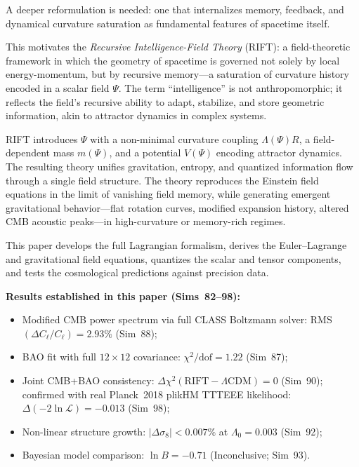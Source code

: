 \documentclass[12pt,a4paper]{article}
\begin{document}
A deeper reformulation is needed: one that internalizes memory, feedback,
and dynamical curvature saturation as fundamental features of spacetime
itself.

This motivates the \emph{Recursive Intelligence-Field Theory} (RIFT):
a field-theoretic framework in which the geometry of spacetime is
governed not solely by local energy-momentum, but by recursive memory---a
saturation of curvature history encoded in a scalar field $\Psi$. The
term ``intelligence'' is not anthropomorphic; it reflects the field's
recursive ability to adapt, stabilize, and store geometric information,
akin to attractor dynamics in complex systems.

RIFT introduces $\Psi$ with a non-minimal curvature coupling $\Lambda(\Psi)R$,
a field-dependent mass $m(\Psi)$, and a potential $V(\Psi)$ encoding
attractor dynamics. The resulting theory unifies gravitation, entropy,
and quantized information flow through a single field structure. The
theory reproduces the Einstein field equations in the limit of vanishing
field memory, while generating emergent gravitational behavior---flat
rotation curves, modified expansion history, altered CMB acoustic
peaks---in high-curvature or memory-rich regimes.

This paper develops the full Lagrangian formalism, derives the Euler--Lagrange
and gravitational field equations, quantizes the scalar and tensor components,
and tests the cosmological predictions against precision data.

\noindent\textbf{Results established in this paper (Sims~82--98):}
\begin{itemize}
  \item Modified CMB power spectrum via full CLASS Boltzmann solver:
        RMS$(\Delta C_\ell/C_\ell) = 2.93\%$ (Sim~88);
  \item BAO fit with full $12\times12$ covariance:
        $\chi^2/\mathrm{dof} = 1.22$ (Sim~87);
  \item Joint CMB+BAO consistency: $\Delta\chi^2(\mathrm{RIFT}-\Lambda\mathrm{CDM}) = 0$
        (Sim~90); confirmed with real Planck~2018 plikHM TTTEEE likelihood:
        $\Delta(-2\ln\mathcal{L}) = -0.013$ (Sim~98);
  \item Non-linear structure growth: $|\Delta\sigma_8| < 0.007\%$ at
        $\Lambda_0 = 0.003$ (Sim~92);
  \item Bayesian model comparison: $\ln B = -0.71$ (Inconclusive; Sim~93).
\end{itemize}
\end{document}
